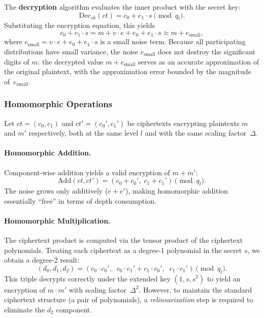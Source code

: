 The \textbf{decryption} algorithm evaluates the inner product with the secret key:
\begin{equation}
    \mathrm{Dec}_{\mathit{sk}}(\mathit{ct}) = c_0 + c_1 \cdot s \pmod{q_l}.
    \label{eq:ckks_dec}
\end{equation}
Substituting the encryption equation, this yields
\begin{equation}
    c_0 + c_1 \cdot s = m + v \cdot e + e_0 + e_1 \cdot s \approx m + e_{\mathrm{small}},
\end{equation}
where $e_{\mathrm{small}} = v \cdot e + e_0 + e_1 \cdot s$ is a small noise term. Because all participating distributions have small variance, the noise $e_{\mathrm{small}}$ does not destroy the significant digits of $m$: the decrypted value $m + e_{\mathrm{small}}$ serves as an accurate approximation of the original plaintext, with the approximation error bounded by the magnitude of~$e_{\mathrm{small}}$.

\subsubsection{Homomorphic Operations}

Let $\mathit{ct} = (c_0, c_1)$ and $\mathit{ct}' = (c_0', c_1')$ be ciphertexts encrypting plaintexts $m$ and $m'$ respectively, both at the same level $l$ and with the same scaling factor~$\Delta$.

\paragraph{Homomorphic Addition.} Component-wise addition yields a valid encryption of $m + m'$:
\begin{equation}
    \mathrm{Add}(\mathit{ct}, \mathit{ct}') = (c_0 + c_0',\; c_1 + c_1') \pmod{q_l}.
    \label{eq:ckks_add}
\end{equation}
The noise grows only additively ($e + e'$), making homomorphic addition essentially ``free'' in terms of depth consumption.

\paragraph{Homomorphic Multiplication.} The ciphertext product is computed via the tensor product of the ciphertext polynomials. Treating each ciphertext as a degree-1 polynomial in the secret $s$, we obtain a degree-2 result:
\begin{equation}
    (d_0, d_1, d_2) = \left(c_0 \cdot c_0',\;\; c_0 \cdot c_1' + c_1 \cdot c_0',\;\; c_1 \cdot c_1'\right) \pmod{q_l}.
    \label{eq:ckks_tensormult}
\end{equation}
This triple decrypts correctly under the extended key $(1, s, s^2)$ to yield an encryption of $m \cdot m'$ with scaling factor~$\Delta^2$. However, to maintain the standard ciphertext structure (a pair of polynomials), a \emph{relinearization} step is required to eliminate the $d_2$ component.

